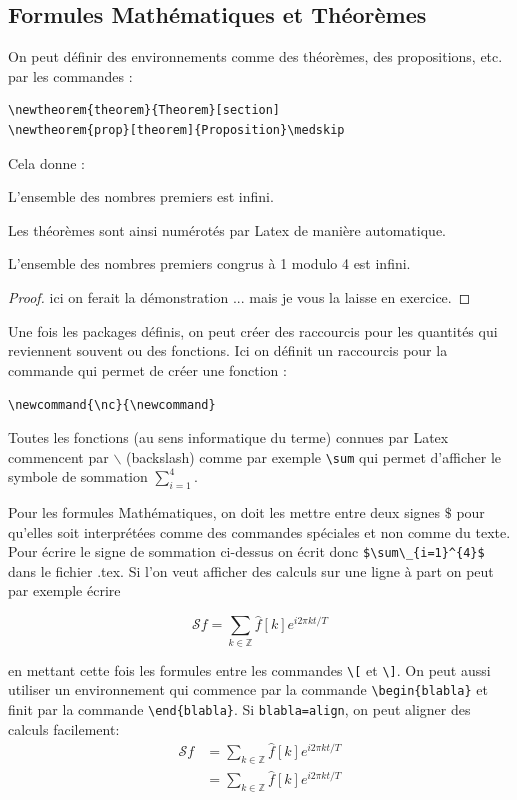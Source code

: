 \documentclass[a4paper,10pt]{article}
\begin{document}
\subsection{Formules Mathématiques et Théorèmes}
On peut définir des environnements comme des théorèmes, des propositions, etc. par les commandes :\medskip
\begin{lstlisting}
\newtheorem{theorem}{Theorem}[section] 
\newtheorem{prop}[theorem]{Proposition}\medskip
\end{lstlisting}
Cela donne :

\begin{theorem}
 L'ensemble des nombres premiers est infini.
\end{theorem}
Les théorèmes  sont ainsi numérotés par Latex de manière automatique.

\begin{theorem}
 L'ensemble des nombres premiers congrus à 1 modulo 4 est infini.
\end{theorem}

\begin{proof}
 ici on ferait la démonstration ... mais  je vous la laisse en exercice.
\end{proof}



Une fois les packages définis, on peut créer des raccourcis pour les quantités qui reviennent souvent ou des fonctions. Ici on définit un raccourcis pour la commande qui permet de créer une fonction :\medskip

\lstinline+\newcommand{\nc}{\newcommand}+

\begin{rem}
 Toutes les fonctions (au sens informatique du terme) connues par Latex commencent par $\backslash$ (backslash) comme par exemple \lstinline+\sum+
 qui permet d'afficher le symbole de sommation $\sum_{i=1}^{4}$. 
\end{rem}


Pour les formules Mathématiques, on doit  les mettre entre deux signes 
$\$$ pour qu'elles soit interprétées comme des commandes spéciales et non comme du texte. 
Pour écrire le signe de sommation ci-dessus on écrit donc \lstinline+$\sum\_{i=1}^{4}$+ dans le fichier .tex. Si l'on veut afficher des calculs sur une ligne à part on peut par exemple écrire 

\[\mathcal{S}f = \sum_{k\in\mathbb{Z}} \hat f[k] e^{i2\pi kt/T} \] 

en mettant cette fois les formules  entre  les commandes 
\lstinline+\[+ et \lstinline+\]+. On peut aussi utiliser un environnement qui commence par la commande 
\lstinline+\begin{blabla}+ et finit par la commande \lstinline+\end{blabla}+. Si \lstinline+blabla=align+, 
on peut aligner des calculs facilement:
\begin{align}
 \mathcal{S}f & = \sum_{k\in\mathbb{Z}} \hat f[k] e^{i2\pi kt/T} \label{nomformule}\\
  & = \sum_{k\in\mathbb{Z}} \hat f[k] e^{i2\pi kt/T}
\end{align}
\end{document}
